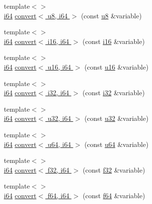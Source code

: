 \begin{DoxyCompactItemize}
\item 
{\footnotesize template$<$$>$ }\\\hyperlink{types_8h_a85cb35fbe5bf2961d7ad5f26814a91a2}{i64} \hyperlink{namespacecrap_aa08e695b6710a147ccc782f3fc22e3ba}{convert$<$ u8, i64 $>$} (const \hyperlink{types_8h_a92c50087ca0e64fa93fc59402c55f8ca}{u8} \&variable)
\item 
{\footnotesize template$<$$>$ }\\\hyperlink{types_8h_a85cb35fbe5bf2961d7ad5f26814a91a2}{i64} \hyperlink{namespacecrap_a172b9dd56fb991b1799560e25417ec7d}{convert$<$ i16, i64 $>$} (const \hyperlink{types_8h_ad309dbcaeea13aa602d686964156ea0b}{i16} \&variable)
\item 
{\footnotesize template$<$$>$ }\\\hyperlink{types_8h_a85cb35fbe5bf2961d7ad5f26814a91a2}{i64} \hyperlink{namespacecrap_afafbe55d8b70a013b4a804ef8c88e845}{convert$<$ u16, i64 $>$} (const \hyperlink{types_8h_ace9d960e74685e2cd84b36132dbbf8aa}{u16} \&variable)
\item 
{\footnotesize template$<$$>$ }\\\hyperlink{types_8h_a85cb35fbe5bf2961d7ad5f26814a91a2}{i64} \hyperlink{namespacecrap_a570b21791d8fb75990b728e43de92674}{convert$<$ i32, i64 $>$} (const \hyperlink{types_8h_a48d6cd8e4135fb2ff7e7f2dac84089ec}{i32} \&variable)
\item 
{\footnotesize template$<$$>$ }\\\hyperlink{types_8h_a85cb35fbe5bf2961d7ad5f26814a91a2}{i64} \hyperlink{namespacecrap_a7ca5443e6efeb5eaab599c5604457b94}{convert$<$ u32, i64 $>$} (const \hyperlink{types_8h_afaa62991928fb9fb18ff0db62a040aba}{u32} \&variable)
\item 
{\footnotesize template$<$$>$ }\\\hyperlink{types_8h_a85cb35fbe5bf2961d7ad5f26814a91a2}{i64} \hyperlink{namespacecrap_a8e0c45c5b84cc1f460593e899cad0173}{convert$<$ u64, i64 $>$} (const \hyperlink{types_8h_a3f7e2bcbb0b4c338f3c4f6c937cd4234}{u64} \&variable)
\item 
{\footnotesize template$<$$>$ }\\\hyperlink{types_8h_a85cb35fbe5bf2961d7ad5f26814a91a2}{i64} \hyperlink{namespacecrap_a145dd81d5d303943a68250dcb18eddca}{convert$<$ f32, i64 $>$} (const \hyperlink{types_8h_a154db6eda6a99565cb060a1da4b4c930}{f32} \&variable)
\item 
{\footnotesize template$<$$>$ }\\\hyperlink{types_8h_a85cb35fbe5bf2961d7ad5f26814a91a2}{i64} \hyperlink{namespacecrap_adb33cb791ade22495e2b46c42de6d944}{convert$<$ f64, i64 $>$} (const \hyperlink{types_8h_a76c9f53497f766e57b184bc8a93ab73f}{f64} \&variable)

\end{DoxyCompactItemize}
